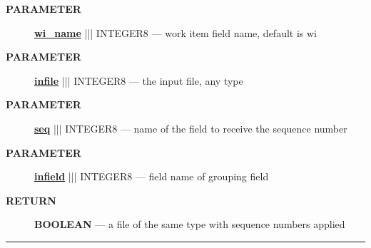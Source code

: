 \par
\begin{description}
\item [\colorbox{tagtype}{\color{white} \textbf{\textsf{PARAMETER}}}] \textbf{\underline{wi\_name}} ||| INTEGER8 --- work item field name, default is wi
\item [\colorbox{tagtype}{\color{white} \textbf{\textsf{PARAMETER}}}] \textbf{\underline{infile}} ||| INTEGER8 --- the input file, any type
\item [\colorbox{tagtype}{\color{white} \textbf{\textsf{PARAMETER}}}] \textbf{\underline{seq}} ||| INTEGER8 --- name of the field to receive the sequence number
\item [\colorbox{tagtype}{\color{white} \textbf{\textsf{PARAMETER}}}] \textbf{\underline{infield}} ||| INTEGER8 --- field name of grouping field
\end{description}







\par
\begin{description}
\item [\colorbox{tagtype}{\color{white} \textbf{\textsf{RETURN}}}] \textbf{BOOLEAN} --- a file of the same type with sequence numbers applied
\end{description}




\rule{\linewidth}{0.5pt}

